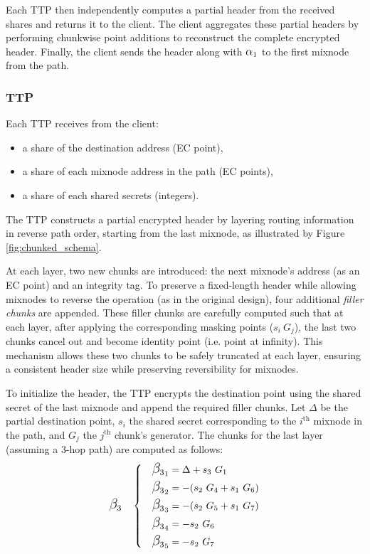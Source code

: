 Each TTP then independently computes a partial header from the received shares and returns it to the client. 
The client aggregates these partial headers by performing chunkwise point additions to reconstruct the complete encrypted header.
Finally, the client sends the header along with $ \ALPHA_1 $ to the first mixnode from the path. 

\subsubsection{TTP}
Each TTP receives from the client:
\begin{itemize}
    \item a share of the destination address (EC point),
    \item a share of each mixnode address in the path (EC points),
    \item a share of each shared secrets (integers).
\end{itemize}

The TTP constructs a partial encrypted header by layering routing information in reverse path order, starting from the last mixnode, as illustrated by Figure \ref{fig:chunked_schema}.

At each layer, two new chunks are introduced: the next mixnode’s address (as an EC point) and an integrity tag.  
To preserve a fixed-length header while allowing mixnodes to reverse the operation (as in the original design), four additional \emph{filler chunks} are appended.  
These filler chunks are carefully computed such that at each layer, after applying the corresponding masking points ($s_i \ G_j$), the last two chunks cancel out and become identity point (i.e. point at infinity).  
This mechanism allows these two chunks to be safely truncated at each layer, ensuring a consistent header size while preserving reversibility for mixnodes.

To initialize the header, the TTP encrypts the destination point using the shared secret of the last mixnode and append the required filler chunks. 
Let $ \Delta $ be the partial destination point, $ s_i $ the shared secret corresponding to the $ i^\text{th} $ mixnode in the path, and $ G_j $ the $ j^\text{th} $ chunk's generator. 
The chunks for the last layer (assuming a 3-hop path) are computed as follows:
\begin{equation}
\BETA_3 \quad \left\{ \quad
\begin{aligned}
    {\BETA_3}_1 &= \Delta       + s_3 \ G_1 \\
    {\BETA_3}_2 &= - (s_2 \ G_4 + s_1 \ G_6) \\
    {\BETA_3}_3 &= - (s_2 \ G_5 + s_1 \ G_7) \\
    {\BETA_3}_4 &= - s_2 \ G_6 \\
    {\BETA_3}_5 &= - s_2 \ G_7 \\
\end{aligned}
\right.
\label{eq:last_layer}
\end{equation}

